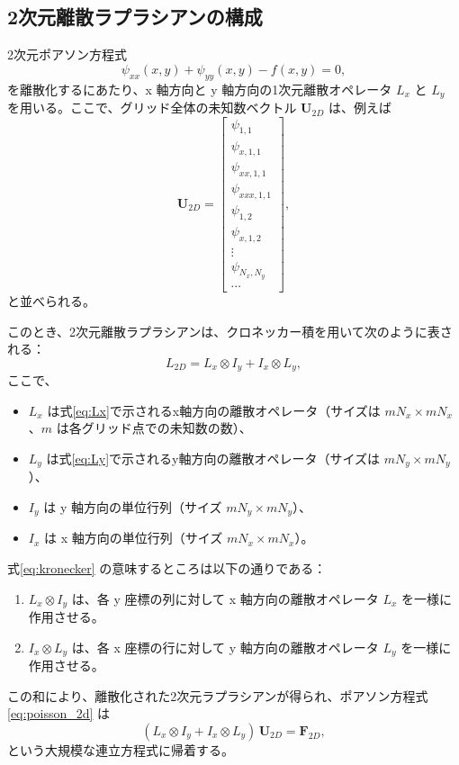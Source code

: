 \documentclass[11pt]{article}
\begin{document}
\subsection{2次元離散ラプラシアンの構成}
2次元ポアソン方程式
\begin{equation}
  \psi_{xx}(x,y) + \psi_{yy}(x,y) - f(x,y) = 0,
  \label{eq:poisson_2d}
\end{equation}
を離散化するにあたり、x 軸方向と y 軸方向の1次元離散オペレータ $L_x$ と $L_y$ を用いる。ここで、グリッド全体の未知数ベクトル $\mathbf{U}_{2D}$ は、例えば
\[
\mathbf{U}_{2D} = \begin{bmatrix}
  \psi_{1,1} \\ \psi_{x,1,1} \\ \psi_{xx,1,1} \\ \psi_{xxx,1,1} \\ \psi_{1,2} \\ \psi_{x,1,2} \\ \vdots \\ \psi_{N_x,N_y} \\ \cdots
\end{bmatrix},
\]
と並べられる。\newline

このとき、2次元離散ラプラシアンは、クロネッカー積を用いて次のように表される：
\begin{equation}
  L_{2D} = L_x \otimes I_y + I_x \otimes L_y,
  \label{eq:kronecker}
\end{equation}
ここで、
\begin{itemize}
  \item $L_x$ は式\eqref{eq:Lx}で示されるx軸方向の離散オペレータ（サイズは $mN_x \times mN_x$、$m$ は各グリッド点での未知数の数）、
  \item $L_y$ は式\eqref{eq:Ly}で示されるy軸方向の離散オペレータ（サイズは $mN_y \times mN_y$）、
  \item $I_y$ は y 軸方向の単位行列（サイズ $mN_y \times mN_y$）、
  \item $I_x$ は x 軸方向の単位行列（サイズ $mN_x \times mN_x$）。
\end{itemize}
式\eqref{eq:kronecker} の意味するところは以下の通りである：
\begin{enumerate}
  \item $L_x \otimes I_y$ は、各 y 座標の列に対して x 軸方向の離散オペレータ $L_x$ を一様に作用させる。
  \item $I_x \otimes L_y$ は、各 x 座標の行に対して y 軸方向の離散オペレータ $L_y$ を一様に作用させる。
\end{enumerate}
この和により、離散化された2次元ラプラシアンが得られ、ポアソン方程式\eqref{eq:poisson_2d} は
\begin{equation}
  (L_x \otimes I_y + I_x \otimes L_y)\,\mathbf{U}_{2D} = \mathbf{F}_{2D},
\end{equation}
という大規模な連立方程式に帰着する。\newline
\end{document}
